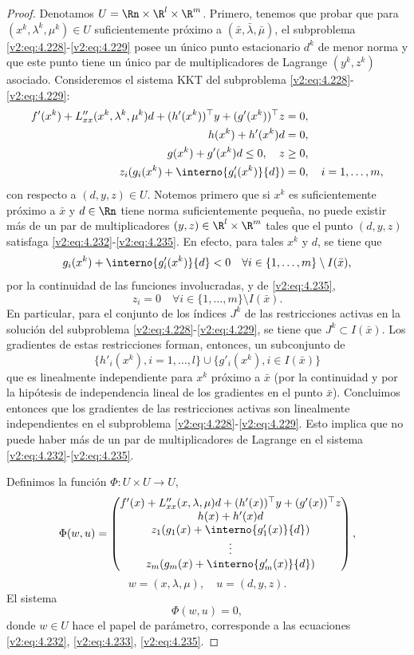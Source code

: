 \begin{proof}
Denotamos $U = \Rn \times \R^l \times \R^m$. Primero, tenemos que probar que para $(x^k, \lambda^k, \mu^k) \in U$ suficientemente próximo a $(\bar{x}, \bar{\lambda}, \bar{\mu})$, el subproblema \eqref{v2:eq:4.228}-\eqref{v2:eq:4.229} posee un único punto estacionario $d^k$ de menor norma y que este punto tiene un único par de multiplicadores de Lagrange $(y^k, z^k)$ asociado. Consideremos el sistema KKT del subproblema \eqref{v2:eq:4.228}-\eqref{v2:eq:4.229}:
\begin{align}
f'(x^k) + L''_{xx}(x^k, \lambda^k, \mu^k)d + (h'(x^k))^\top y + (g'(x^k))^\top z &= 0, \label{v2:eq:4.232} \\
h(x^k) + h'(x^k)d &= 0, \label{v2:eq:4.233} \\
g(x^k) + g'(x^k)d \le 0, \quad z &\ge 0, \label{v2:eq:4.234} \\
z_i(g_i(x^k) + \interno{g'_i(x^k)}{d}) &= 0, \quad i = 1, \dots, m, \label{v2:eq:4.235}
\end{align}
con respecto a $(d, y, z) \in U$. Notemos primero que si $x^k$ es suficientemente próximo a $\bar{x}$ y $d \in \Rn$ tiene norma suficientemente pequeña, no puede existir más de un par de multiplicadores $(y, z) \in \R^l \times \R^m$ tales que el punto $(d, y, z)$ satisfaga \eqref{v2:eq:4.232}-\eqref{v2:eq:4.235}. En efecto, para tales $x^k$ y $d$, se tiene que
\[
g_i(x^k) + \interno{g'_i(x^k)}{d} < 0 \quad \forall i \in \{ 1, \dots, m \} \setminus I(\bar{x}),
\]
por la continuidad de las funciones involucradas, y de \eqref{v2:eq:4.235},
\[
z_i = 0 \quad \forall i \in \{ 1, \dots, m \} \setminus I(\bar{x}).
\]
En particular, para el conjunto de los índices $J^k$ de las restricciones activas en la solución del subproblema \eqref{v2:eq:4.228}-\eqref{v2:eq:4.229}, se tiene que $J^k \subset I(\bar{x})$. Los gradientes de estas restricciones forman, entonces, un subconjunto de
\[
\{ h'_i(x^k), i = 1, \dots, l \} \cup \{ g'_i(x^k), i \in I(\bar{x}) \}
\]
que es linealmente independiente para $x^k$ próximo a $\bar{x}$ (por la continuidad y por la hipótesis de independencia lineal de los gradientes en el punto $\bar{x}$). Concluimos entonces que los gradientes de las restricciones activas son linealmente independientes en el subproblema \eqref{v2:eq:4.228}-\eqref{v2:eq:4.229}. Esto implica que no puede haber más de un par de multiplicadores de Lagrange en el sistema \eqref{v2:eq:4.232}-\eqref{v2:eq:4.235}.

Definimos la función $\Phi \colon U \times U \to U$,
\[
\Phi(w, u) = \begin{pmatrix} f'(x) + L''_{xx}(x, \lambda, \mu)d + (h'(x))^\top y + (g'(x))^\top z \\ h(x) + h'(x)d \\ z_1(g_1(x) + \interno{g'_1(x)}{d}) \\ \vdots \\ z_m(g_m(x) + \interno{g'_m(x)}{d}) \end{pmatrix},
\]
\[
w = (x, \lambda, \mu), \quad u = (d, y, z).
\]
El sistema
\[
\Phi(w, u) = 0,
\]
donde $w \in U$ hace el papel de parámetro, corresponde a las ecuaciones \eqref{v2:eq:4.232}, \eqref{v2:eq:4.233}, \eqref{v2:eq:4.235}.


\end{proof}

